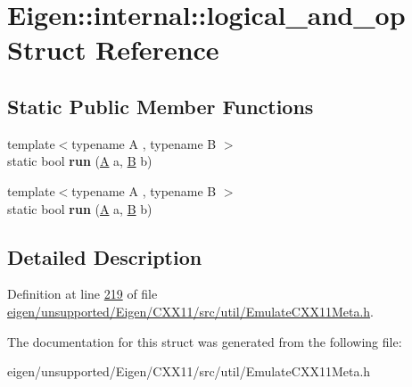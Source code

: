 \hypertarget{struct_eigen_1_1internal_1_1logical__and__op}{}\section{Eigen\+:\+:internal\+:\+:logical\+\_\+and\+\_\+op Struct Reference}
\label{struct_eigen_1_1internal_1_1logical__and__op}
\subsection*{Static Public Member Functions}
\begin{DoxyCompactItemize}
\item 
\mbox{\label{struct_eigen_1_1internal_1_1logical__and__op_a720469b6323f39a031f019a65a1e3efe}} 
{\footnotesize template$<$typename A , typename B $>$ }\\static bool {\bfseries run} (\hyperlink{group___core___module_class_eigen_1_1_matrix}{A} a, \hyperlink{group___core___module_class_eigen_1_1_matrix}{B} b)
\item 
\mbox{\label{struct_eigen_1_1internal_1_1logical__and__op_a720469b6323f39a031f019a65a1e3efe}} 
{\footnotesize template$<$typename A , typename B $>$ }\\static bool {\bfseries run} (\hyperlink{group___core___module_class_eigen_1_1_matrix}{A} a, \hyperlink{group___core___module_class_eigen_1_1_matrix}{B} b)
\end{DoxyCompactItemize}


\subsection{Detailed Description}


Definition at line \hyperlink{eigen_2unsupported_2_eigen_2_c_x_x11_2src_2util_2_emulate_c_x_x11_meta_8h_source_l00219}{219} of file \hyperlink{eigen_2unsupported_2_eigen_2_c_x_x11_2src_2util_2_emulate_c_x_x11_meta_8h_source}{eigen/unsupported/\+Eigen/\+C\+X\+X11/src/util/\+Emulate\+C\+X\+X11\+Meta.\+h}.



The documentation for this struct was generated from the following file\+:\begin{DoxyCompactItemize}
\item 
eigen/unsupported/\+Eigen/\+C\+X\+X11/src/util/\+Emulate\+C\+X\+X11\+Meta.\+h\end{DoxyCompactItemize}
